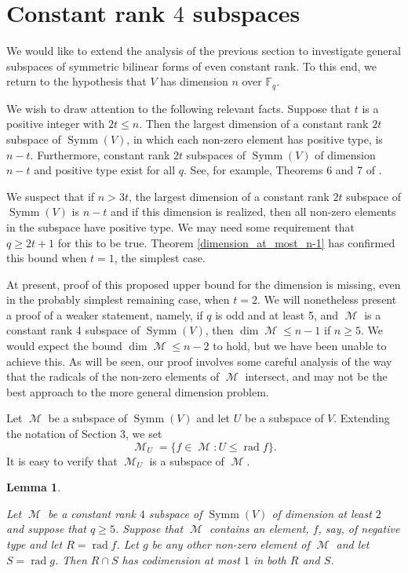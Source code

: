 \documentclass{amsart}
\DeclareMathOperator{\M}{\mathcal{M}}
\DeclareMathOperator{\rad}{rad}
\DeclareMathOperator{\Symm}{Symm}
\theoremstyle{plain}
\newtheorem{lemma}{Lemma}
\theoremstyle{definition}
\begin{document}
\section{Constant rank $4$ subspaces}

\noindent We would like to extend the analysis of the previous section to investigate general subspaces of symmetric bilinear forms of even constant rank. To this end, we return to the hypothesis that $V$ has dimension $n$ over $\mathbb{F}_{q}$.

We wish to draw attention to the following relevant facts. Suppose that $t$ is a positive integer with $2t\leq n$. Then the largest dimension
of a constant rank $2t$ subspace of $\Symm(V)$, in which each non-zero element has positive type, is $n-t$. Furthermore, constant rank $2t$ subspaces of $\Symm(V)$ of dimension $n-t$ and positive type exist for all $q$. See, for example, Theorems 6 and 7 of \cite{DGS}.

We suspect that if $n>3t$, the largest dimension of a constant rank $2t$ subspace of $\Symm(V)$ is $n-t$ and if this dimension is realized, then all non-zero elements in the subspace have positive type. We may need some requirement that $q\geq 2t+1$ for this to be true. Theorem \ref{dimension_at_most_n-1} has confirmed this bound when $t=1$, the simplest case.

At present, proof of this proposed upper bound for the dimension is missing, even in the probably simplest remaining case, when $t=2$. We will nonetheless present a proof of a weaker statement, namely, if $q$ is odd and at least 5, and $\M$ is a constant rank 4 subspace of $\Symm(V)$, then
$\dim \M\leq n-1$ if $n\geq 5$. We would expect the bound $\dim \M\leq n-2$ to hold, but we have been unable to achieve this. As will be seen, our proof involves some careful analysis of the way that the radicals of the non-zero elements of $\M$ intersect, and may not be the best
approach to the more general dimension problem.

Let $\M$ be a subspace of $\Symm(V)$ and let $U$ be a subspace of $V$. Extending the notation of  Section 3, we set
\[
 \M_U=\{ f\in \M: U\leq \rad f\}.
\]
It is easy to verify that $\M_U$ is a subspace of $\M$. 

\begin{lemma} \label{radical_intersection}
 
Let $\M$ be a constant rank $4$ subspace of $\Symm(V)$ of dimension at least $2$ and suppose that $q\geq 5$. Suppose that $\M$ contains an element,
$f$, say, of negative type and let $R=\rad f$. Let $g$ be any other non-zero element of $\M$ and let $S=\rad g$. Then $R\cap S$ has codimension at most $1$ in both $R$ and $S$. 
\end{lemma}
\end{document}
